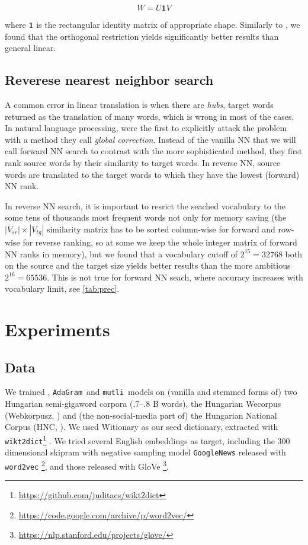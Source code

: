 \documentclass[11pt]{article}
\newcommand{\neelakantan}{\cite{Neelakantan:2014}}
\newcommand{\adagram}{\texttt{AdaGram}}
\newcommand{\mutli}{\texttt{mutli}}
\begin{document}
\[W=U\mathbf{1}V\]

\noindent where $\mathbf 1$ is the rectangular identity matrix of appropriate shape.
Similarly to \cite{Xing:2015}, we found that the orthogonal restriction yields
significantly better results than general linear.

\subsection{Reverese nearest neighbor search}

A common error in linear translation is when there are \emph{hubs}, target
words returned as the translation of many words, which is wrong in most of the
cases.  In natural language processing, \cite{Dinu:2015} were the first to
explicitly attack the problem with a method they call \emph{global correction}.
Instead of the vanilla NN that we will call forward NN search to contrast with
the more sophisticated method, they first rank source words by their similarity
to target words. In reverse NN, source words are translated to the target words
to which they have the lowest (forward) NN rank.

In reverse NN search, it is important to resrict the seached vocabulary to the
some tens of thousands most frequent words not only for memory saving (the
$|V_{sr}|\times|V_{tg}|$ similarity matrix has to be sorted column-wise for
forward and row-wise for reverse ranking, so at some we keep the whole integer
matrix of forward NN ranks in memory), but we found that a vocabulary cutoff of
$2^{15}=32768$ both on the source and the target size yields better results
than the more ambitious $2^{16}=65536$. This is not true for forward NN seach,
where accuracy increases with vocabulary limit, see \cref{tab:prec}.

\section{Experiments}

\subsection{Data}

We trained \neelakantan, \adagram~and \mutli~models on (vanilla and stemmed
forms of) two Hungarian semi-gigaword corpora (.7--.8 B words), the Hungarian
Wecorpus (Webkorpusz, \cite{Halacsy:2004}) and (the non-social-media part of) the
Hungarian National Corpus (HNC, \cite{Oravecz:2014}).  We used Witionary as our
seed dictionary, extracted with
\texttt{wikt2dict}\footnote{\url{https://github.com/juditacs/wikt2dict}}
\citep{Acs:2013}. We tried several English embeddings as target, including the
300 dimensional skipram with negative sampling model
\texttt{GoogleNews} released with \texttt{word2vec}
\citep{Mikolov:2013f}\footnote{\url{https://code.google.com/archive/p/word2vec/}},
and those released with GloVe
\citep{Pennington:2014}\footnote{\url{https://nlp.stanford.edu/projects/glove/}}.
\end{document}
